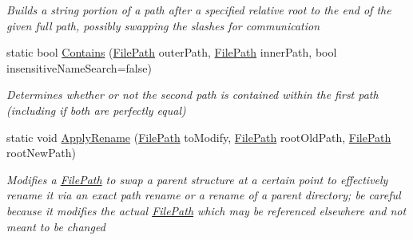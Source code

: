 \begin{DoxyCompactItemize}
\begin{DoxyCompactList}\small\item\em Builds a string portion of a path after a specified relative root to the end of the given full path, possibly swapping the slashes for communication \end{DoxyCompactList}\item 
static bool \hyperlink{class_cloud_api_public_1_1_model_1_1_file_path_a1a4f9140292e984320a720d810a196fd}{Contains} (\hyperlink{class_cloud_api_public_1_1_model_1_1_file_path}{File\-Path} outer\-Path, \hyperlink{class_cloud_api_public_1_1_model_1_1_file_path}{File\-Path} inner\-Path, bool insensitive\-Name\-Search=false)
\begin{DoxyCompactList}\small\item\em Determines whether or not the second path is contained within the first path (including if both are perfectly equal) \end{DoxyCompactList}\item 
static void \hyperlink{class_cloud_api_public_1_1_model_1_1_file_path_ac899f6153fd260eec0386a7e141a7896}{Apply\-Rename} (\hyperlink{class_cloud_api_public_1_1_model_1_1_file_path}{File\-Path} to\-Modify, \hyperlink{class_cloud_api_public_1_1_model_1_1_file_path}{File\-Path} root\-Old\-Path, \hyperlink{class_cloud_api_public_1_1_model_1_1_file_path}{File\-Path} root\-New\-Path)
\begin{DoxyCompactList}\small\item\em Modifies a \hyperlink{class_cloud_api_public_1_1_model_1_1_file_path}{File\-Path} to swap a parent structure at a certain point to effectively rename it via an exact path rename or a rename of a parent directory; be careful because it modifies the actual \hyperlink{class_cloud_api_public_1_1_model_1_1_file_path}{File\-Path} which may be referenced elsewhere and not meant to be changed \end{DoxyCompactList}\end{DoxyCompactItemize}
